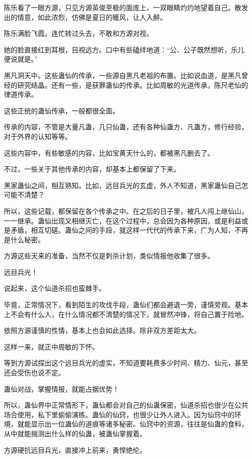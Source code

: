 \begin{this_body}
陈乐看了一眼方源，只见方源英俊至极的面庞上，一双眼睛灼灼地望着自己。散发出的情意，如此浓烈，仿佛是夏日的暖风，让人入醉。

陈乐满脸飞霞。连忙转过头去，不敢和方源对视。

她的脸直接红到耳根，目视远方。口中有些磕绊地道：“公、公子既然想听，乐儿便说就是。”

黑凡洞天中。这些蛊仙的传承，一些源自黑凡老祖的布置。比如说血道，是黑凡曾经的研究结晶。还有一些，是获罪蛊仙的传承。比如周敏的光道传承，陈尺老仙的律道传承。

这些正统的蛊仙传承，一般都很全面。

传承的内容，不管是大量凡蛊，几只仙蛊，还有各种仙蛊方、凡蛊方，修行经验，对于外界的认知等等。

这些内容中，有些敏感的内容，比如宝黄天什么的，都被黑凡删去了。

不过，一些关于其他传承的内容，却基本上都保留了下来。

黑家蛊仙之间，相互熟知。比如，远目兵光的玄虚，外人不知道，黑家蛊仙自己怎可能不清楚？

所以，这些记载，都保留在各个传承之中。在之后的日子里，被凡人闯上继仙山，一一继承。蛊仙出现又相继灭亡，在这个过程中，总会因为各种原因，或是利益或是矛盾，相互切磋。蛊仙之间的手段，就这样一代代的传承下来，广为人知，不再是什么秘密。

方源这些天来的准备，当然不仅是刺杀计划，类似情报他收集了很多。

远目兵光！

说起来，这个仙道杀招也蛮棘手。

毕竟，正常情况下，看到陌生的攻伐手段，蛊仙们都会避退一旁，谨慎旁观。基本上不会有什么人，在什么情况都不清楚的情况下，就冒然冲锋，将自己置于险地。

依照方源谨慎的性情，基本上也会如此选择。除非双方差距太大。

这样一来，就正中周敏的下怀。

等到方源试探出这个远目兵光的虚实，不知道要耗费多少时间、精力、仙元，甚至还会受伤也说不定。

蛊仙对战，掌握情报，就能占据优势！

所以，蛊仙界中正常情形下，蛊仙都会对自己的仙蛊保密，仙道杀招也很少在公共场合使用，私下里偷偷演练。蛊仙的仙窍，也很少让外人进入。因为仙窍中的环境，就能显示出一位蛊仙的道痕等诸多秘密。仙窍中的资源，往往是仙蛊的食料，从中就能揣测出什么样的仙蛊，被蛊仙掌握着。

方源硬抗远目兵光，直接冲上前来，勇悍绝伦。


\end{this_body}
